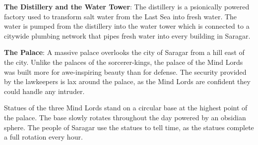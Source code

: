 {
	\textbf{The Distillery and the Water Tower}: The distillery is a psionically powered factory used to transform salt water from the Last Sea into fresh water. The water is pumped from the distillery into the water tower which is connected to a citywide plumbing network that pipes fresh water into every building in Saragar.

	\textbf{The Palace}: A massive palace overlooks the city of Saragar from a hill east of the city. Unlike the palaces of the sorcerer-kings, the palace of the Mind Lords was built more for awe-inspiring beauty than for defense. The security provided by the lawkeepers is lax around the palace, as the Mind Lords are confident they could handle any intruder.

	Statues of the three Mind Lords stand on a circular base at the highest point of the palace. The base slowly rotates throughout the day powered by an obsidian sphere. The people of Saragar use the statues to tell time, as the statues complete a full rotation every hour.
}
